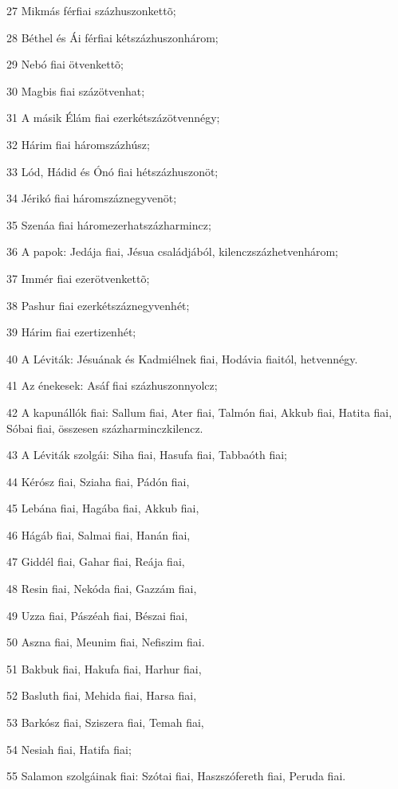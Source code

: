 \par 27 Mikmás férfiai százhuszonkettõ;
\par 28 Béthel és Ái férfiai kétszázhuszonhárom;
\par 29 Nebó fiai ötvenkettõ;
\par 30 Magbis fiai százötvenhat;
\par 31 A másik Élám fiai ezerkétszázötvennégy;
\par 32 Hárim fiai háromszázhúsz;
\par 33 Lód, Hádid és Ónó fiai hétszázhuszonöt;
\par 34 Jérikó fiai háromszáznegyvenöt;
\par 35 Szenáa fiai háromezerhatszázharmincz;
\par 36 A papok: Jedája fiai, Jésua családjából, kilenczszázhetvenhárom;
\par 37 Immér fiai ezerötvenkettõ;
\par 38 Pashur fiai ezerkétszáznegyvenhét;
\par 39 Hárim fiai ezertizenhét;
\par 40 A Léviták: Jésuának és Kadmiélnek fiai, Hodávia fiaitól, hetvennégy.
\par 41 Az énekesek: Asáf fiai százhuszonnyolcz;
\par 42 A kapunállók fiai: Sallum fiai, Ater fiai, Talmón fiai, Akkub fiai, Hatita fiai, Sóbai fiai, összesen százharminczkilencz.
\par 43 A Léviták szolgái: Siha fiai, Hasufa fiai, Tabbaóth fiai;
\par 44 Kérósz fiai, Sziaha fiai, Pádón fiai,
\par 45 Lebána fiai, Hagába fiai, Akkub fiai,
\par 46 Hágáb fiai, Salmai fiai, Hanán fiai,
\par 47 Giddél fiai, Gahar fiai, Reája fiai,
\par 48 Resin fiai, Nekóda fiai, Gazzám fiai,
\par 49 Uzza fiai, Pászéah fiai, Bészai fiai,
\par 50 Aszna fiai, Meunim fiai, Nefiszim fiai.
\par 51 Bakbuk fiai, Hakufa fiai, Harhur fiai,
\par 52 Basluth fiai, Mehida fiai, Harsa fiai,
\par 53 Barkósz fiai, Sziszera fiai, Temah fiai,
\par 54 Nesiah fiai, Hatifa fiai;
\par 55 Salamon szolgáinak fiai: Szótai fiai, Haszszófereth fiai, Peruda fiai.
